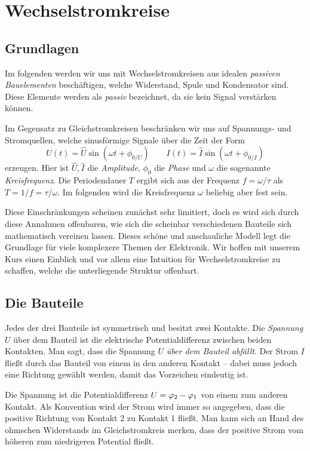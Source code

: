 \section{Wechselstromkreise}
\subsection{Grundlagen}
Im folgenden werden wir uns mit Wechselstromkreisen aus idealen \emph{passiven Bauelementen} beschäftigen, welche
Widerstand, Spule und Kondensator sind. Diese Elemente werden als \emph{passiv} bezeichnet, da sie kein Signal
verstärken können.

Im Gegensatz zu Gleichstromkreisen beschränken wir uns auf Spannungs- und Stromquellen, welche sinusförmige Signale über
die Zeit der Form
\begin{equation}\label{eq:sinusform}
    U(t) = \hat U\sin(\omega t + \phi_{0/U}) \qquad
    I(t) = \hat I\sin(\omega t + \phi_{0/I})
\end{equation}
erzeugen. Hier ist $\hat U, \hat I$ die \emph{Amplitude}, $\phi_0$ die \emph{Phase} und  $\omega$ die sogenannte
\emph{Kreisfrequenz}. Die Periodendauer $T$ ergibt sich aus der Frequenz $f = \omega/\tau$ als $T = 1/f = \tau/\omega$.
Im folgenden wird die Kreisfrequenz $\omega$ beliebig aber fest sein.

Diese Einschränkungen scheinen zunächst sehr limitiert, doch es wird sich durch diese Annahmen offenbaren, wie sich die
scheinbar verschiedenen Bauteile sich mathematisch vereinen lassen. Dieses schöne und anschauliche Modell legt die
Grundlage für viele komplexere Themen der Elektronik. Wir hoffen mit unserem Kurs einen Einblick und vor allem eine
Intuition für Wechselstromkreise zu schaffen, welche die unterliegende Struktur offenbart.

\subsection{Die Bauteile}
Jedes der drei Bauteile ist symmetrisch und besitzt zwei Kontakte. Die \emph{Spannung} $U$ über dem Bauteil ist die
elektrische Potentialdifferenz zwischen beiden Kontakten. Man sagt, dass die Spannung $U$ \emph{über dem Bauteil
abfällt}. Der Strom $I$ fließt durch das Bauteil von einem in den anderen Kontakt -- dabei muss jedoch eine Richtung
gewählt werden, damit das Vorzeichen eindeutig ist.

Die Spannung ist die Potentialdifferenz $U = \oldphi_2 - \oldphi_1$ von einem zum anderen Kontakt. Als Konvention wird der
Strom wird immer so angegeben, dass die positive Richtung von Kontakt 2 zu Kontakt 1 fließt. Man kann sich an Hand des
ohmschen Widerstands im Gleichstromkreis merken, dass der positive Strom vom höheren zum niedrigeren Potential fließt.

